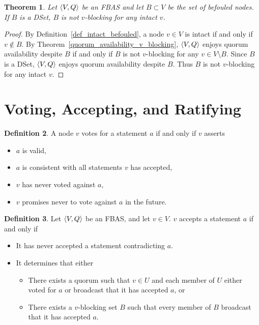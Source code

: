 \documentclass[12pt, psamsfonts]{amsart}
\newtheorem{thm}{Theorem}[section]
\theoremstyle{definition}
\newtheorem{defn}[thm]{Definition}
\theoremstyle{remark}
\numberwithin{equation}{section}
\begin{document}
\begin{thm}\label{dset_v_blocking}
    Let $\ev{V, Q}$ be an FBAS and let $B \subset V$ be the set of befouled nodes.
    If $B$ is a DSet, $B$ is not $v$-blocking for any intact $v$.
\end{thm}

\begin{proof}
    By Definition~\ref{def_intact_befouled}, a node $v \in V$ is intact if and only if $v \notin B$.
    By Theorem~\ref{quorum_availability_v_blocking}, $\ev{V, Q}$ enjoys quorum availability despite $B$ if and only if $B$ is not $v$-blocking for any $v \in V \setminus B$.
    Since $B$ is a DSet, $\ev{V, Q}$ enjoys quorum availability despite $B$.
    Thus $B$ is not $v$-blocking for any intact $v$.
\end{proof}
\section{Voting, Accepting, and Ratifying}

\begin{defn}\label{def_vote}
    A node $v$ votes for a statement $a$ if and only if $v$ asserts
    \begin{itemize}
        \item
            $a$ is valid,
        \item
            $a$ is consistent with all statements $v$ has accepted,
        \item
            $v$ has never voted against $a$,
        \item
            $v$ promises never to vote against $a$ in the future.
    \end{itemize}
\end{defn}

\begin{defn}\label{def_accept}
    Let $\ev{V, Q}$ be an FBAS\@, and let $v \in V$.
    $v$ accepts a statement $a$ if and only if 
    \begin{itemize}
        \item
            It has never accepted a statement contradicting $a$.
        \item
            It determines that either
            \begin{itemize}
                \item
                    There exists a quorum such that $v \in U$ and each member of $U$ either voted for $a$ or broadcast that it has accepted $a$, or
                \item
                    There exists a $v$-blocking set $B$ such that every member of $B$ broadcast that it has accepted $a$.
            \end{itemize}
    \end{itemize}
\end{defn}
\end{document}
